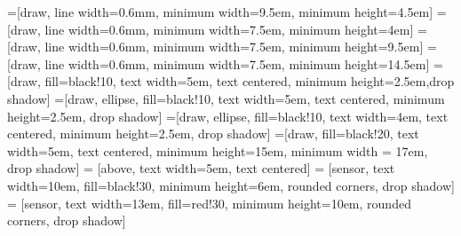 \newcommand{\mx}[1]{\mathbf{\bm{#1}}} %
\newcommand{\vc}[1]{\mathbf{\bm{#1}}} %



=[draw, line width=0.6mm, minimum width=9.5em, minimum height=4.5em]
=[draw, line width=0.6mm, minimum width=7.5em, minimum height=4em]
=[draw, line width=0.6mm, minimum width=7.5em, minimum height=9.5em]
=[draw, line width=0.6mm, minimum width=7.5em, minimum height=14.5em]
=[draw, fill=black!10, text width=5em,
    text centered, minimum height=2.5em,drop shadow]
=[draw, ellipse, fill=black!10, text width=5em,
    text centered, minimum height=2.5em, drop shadow]
=[draw, ellipse, fill=black!10, text width=4em,
    text centered, minimum height=2.5em, drop shadow]
=[draw, fill=black!20, text width=5em,
    text centered, minimum height=15em, minimum width = 17em, drop shadow]
 = [above, text width=5em, text centered]
 = [sensor, text width=10em, fill=black!30,
    minimum height=6em, rounded corners, drop shadow]
 = [sensor, text width=13em, fill=red!30,
    minimum height=10em, rounded corners, drop shadow]


\def\blockdist{1.5}
\def\edgedist{2.5}

